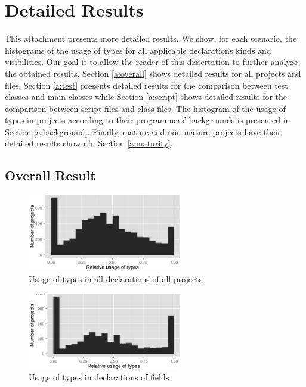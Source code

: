 \chapter{Detailed Results\label{detailed_results}}
This attachment presents more detailed results.
We show, for each scenario, the histograms of the usage of types for all applicable declarations kinds and visibilities.
Our goal is to allow the reader of this dissertation to further analyze the obtained results.
Section \ref{a:overall} shows detailed results for all projects and files.
Section \ref{a:test} presents detailed results for the comparison between test classes and main classes while Section \ref{a:script} shows detailed results for the comparison between script files and class files.
The histogram of the usage of types in projects according to their programmers' backgrounds is presented in Section \ref{a:background}.
Finally, mature and non mature projects have their detailed results shown in Section \ref{a:maturity}.

\section{Overall Result\label{a:overall}}

\begin{figure}[h]
\centering 
\includegraphics[width=0.6\textwidth]{../aosd_2014/analysis/result/all/histograms/5_all_types.png} 
\caption{Usage of types in all declarations of all projects}
\end{figure}

\begin{figure}[h]
\centering 
\includegraphics[width=0.6\textwidth]{../aosd_2014/analysis/result/all/histograms/10_Field.png} 
\caption{Usage of types in declarations of fields}
\end{figure}

